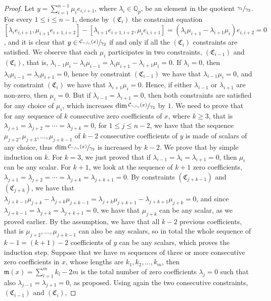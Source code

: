 \documentclass[12pt]{article}
\begin{document}
\begin{proof}
Let $y=\sum_{i=1}^{n-1}\mu_i e_{i,i+1}$, where $\lambda_i\in\mathbb{Q}_p$, be an element in the quotient $\sfrac{\gamma_1}{\gamma_2}$.
For every $1\leq i\leq n-1$, denote by $(\mathfrak{C}_i)$ the constraint equation $[\lambda_i e_{i,i+1},\mu_{i+1}e_{i+1,i+2}]-[\lambda_{i+1}e_{i+1,i+2},\mu_i e_{i,i+1}]=(\lambda_i\mu_{i+1}-\lambda_{i+1}\mu_i)e_{i,i+2}=0$, and it is clear that $y\in\sfrac{\mathcal{C}_{\sfrac{\gamma_1}{\gamma_3}}(x)}{\gamma_2}$ if and only if all the $(\mathfrak{C}_i)$ constraints are satisfied. We observe that each $\mu_i$ participates in two constraints, $(\mathfrak{C}_{i-1})$ and $(\mathfrak{C}_i)$, that is, $\lambda_{i-1}\mu_i-\lambda_i\mu_{i-1}=\lambda_i\mu_{i+1}-\lambda_{i+1}\mu_i=0$. If $\lambda_i=0$, then $\lambda_i\mu_{i-1}=\lambda_i\mu_{i+1}=0$, hence by constraint $(\mathfrak{C}_{i-1})$ we have that $\lambda_{i-1}\mu_i=0$, and by constraint $(\mathfrak{C}_i)$ we have that $\lambda_{i+1}\mu_i=0$. Hence, if either $\lambda_{i-1}$ or $\lambda_{i+1}$ are non-zero, then $\mu_i=0$. But if $\lambda_{i-1}=\lambda_{i+1}=0$, then both constraints are satisfied for any choice of $\mu_i$, which increases $\dim\sfrac{\mathcal{C}_{\sfrac{\gamma_1}{\gamma_3}}(x)}{\gamma_2}$ by $1$. We need to prove that for any sequence of $k$ consecutive zero coefficients of $x$, where $k\geq 3$, that is $\lambda_{j+1}=\lambda_{j+2}=\cdots=\lambda_{j+k}=0$, for $1\leq j\leq n-2$, we have that the sequence $\mu_{j+2},\mu_{j+3},\dots,\mu_{j+k-1}$ of $k-2$ consecutive coefficients of $y$ is made of scalars of any choice, thus $\dim\sfrac{\mathcal{C}_{\sfrac{\gamma_1}{\gamma_3}}(x)}{\gamma_2}$ is increased by $k-2$. We prove that by simple induction on $k$. For $k=3$, we just proved that if $\lambda_{i-1}=\lambda_i=\lambda_{i+1}=0$, then $\mu_i$ can be any scalar. For $k+1$, we look at the sequence of $k+1$ zero coefficients, $\lambda_{j+1}=\lambda_{j+2}=\cdots=\lambda_{j+k}=\lambda_{j+k+1}=0$. By constraints $(\mathfrak{C}_{j+k-1})$ and $(\mathfrak{C}_{j+k})$, we have that $\lambda_{j+k-1}\mu_{j+k}-\lambda_{j+k}\mu_{j+k-1}=\lambda_{j+k}\mu_{j+k+1}-\lambda_{j+k+1}\mu_{j+k}=0$, and since $\lambda_{j+k-1}=\lambda_{j+k}=\lambda_{j+k+1}=0$, we have that $\mu_{j+k}$ can be any scalar, as we proved earlier. By the assumption, we have that all $k-2$ previous coefficients, that is $\mu_{j+2},\dots,\mu_{j+k-1}$ can also be any scalars, so in total the whole sequence of $k-1=(k+1)-2$ coefficients of $y$ can be any scalars, which proves the induction step. Suppose that we have $m$ sequences of three or more consecutive zero coefficients in $x$, whose lengths are $k_1,k_2,\dots,k_m$, then $\mathfrak{m}(x)=\sum_{l=1}^m k_l-2m$ is the total number of zero coefficients $\lambda_j=0$ such that also $\lambda_{j-1}=\lambda_{j+1}=0$, as proposed. Using again the two consecutive constraints, $(\mathfrak{C}_{i-1})$ and $(\mathfrak{C}_i)$,

\end{proof}
\end{document}
